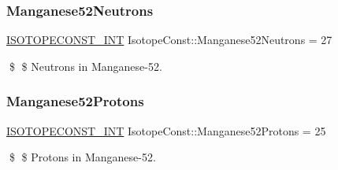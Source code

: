 \subsubsection{\texorpdfstring{Manganese52\+Neutrons}{Manganese52Neutrons}}
{\footnotesize\ttfamily \mbox{\hyperlink{group___isotope_const-_macros_ga5f18360b3e99483a35c32d789e62621c}{I\+S\+O\+T\+O\+P\+E\+C\+O\+N\+S\+T\+\_\+\+I\+NT}} Isotope\+Const\+::\+Manganese52\+Neutrons = 27}

\$ \$ Neutrons in Manganese-\/52. \mbox{\label{group___isotope_const-_manganese-_mn52_ga19b4bf74e77a53d3f5d46bc06667ed99}} 
\subsubsection{\texorpdfstring{Manganese52\+Protons}{Manganese52Protons}}
{\footnotesize\ttfamily \mbox{\hyperlink{group___isotope_const-_macros_ga5f18360b3e99483a35c32d789e62621c}{I\+S\+O\+T\+O\+P\+E\+C\+O\+N\+S\+T\+\_\+\+I\+NT}} Isotope\+Const\+::\+Manganese52\+Protons = 25}

\$ \$ Protons in Manganese-\/52. 
